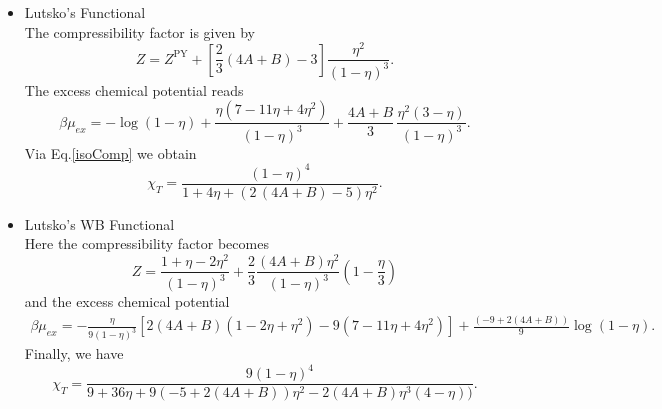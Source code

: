 \documentclass{article}
\begin{document}
\begin{itemize}
	\item Lutsko's Functional\\
		The compressibility factor is given by
		\begin{equation}
			Z = Z^{\text{PY}} + \left[\frac{2}{3}(4A+B)-3\right]\frac{\eta^2}{(1-\eta)^3}.
		\end{equation}
		The excess chemical potential reads
		\begin{equation}
			\beta\mu_{ex} = -\log(1-\eta)+\frac{\eta(7-11\eta+4\eta^2)}{(1-\eta)^3}+\frac{4A+B}{3}\,\frac{\eta^2(3-\eta)}{(1-\eta)^3}.
		\end{equation}
		Via Eq.\eqref{isoComp} we obtain 
		\begin{equation}
			\chi_T = \frac{(1-\eta)^4}{1+4\eta+(2\,(4A+B)-5)\eta^2}.
		\end{equation}
	\item Lutsko's WB Functional\\
		Here the compressibility factor becomes
		\begin{equation}
			Z = \frac{1+\eta-2\eta^2}{(1-\eta)^3}+\frac{2}{3}\frac{(4A+B)\eta^2}{(1-\eta)^3}\left(1-\frac{\eta}{3}\right)
		\end{equation}
		and the excess chemical potential
		\begin{gather}
			\beta\mu_{ex} = -\frac{\eta}{9(1-\eta)^3}\left[2(4A+B)(1-2\eta+\eta^2)-9(7-11\eta+4\eta^2)\right]+
			\frac{(-9+2(4A+B))}{9}\log(1-\eta).
		\end{gather} 
		Finally, we have
		\begin{equation}
			\chi_T = \frac{9(1-\eta)^4}{9+36\eta+9(-5+2(4A+B))\eta^2-2(4A+B)\eta^3(4-\eta) )}.
		\end{equation}
\end{itemize}
\end{document}

